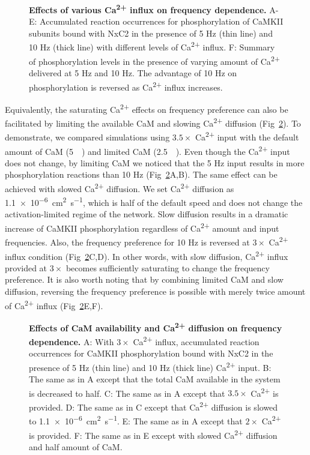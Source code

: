 \documentclass[10pt,letterpaper]{article}
\begin{document}
\begin{figure}[!h]
	\caption{{\bf Effects of various Ca\textsuperscript{2+} influx on frequency dependence.}
	A-E: Accumulated reaction occurrences for phosphorylation of CaMKII subunits bound with NxC2 in the presence of 5 Hz (thin line) and 10 Hz (thick line) with different levels of Ca\textsuperscript{2+} influx. 
	F: Summary of phosphorylation levels in the presence of varying amount of Ca\textsuperscript{2+} delivered at 5 Hz and 10 Hz. The advantage of 10 Hz on phosphorylation is reversed as Ca\textsuperscript{2+} influx increases.
	}
\label{fig9}
\end{figure}

Equivalently, the saturating Ca\textsuperscript{2+} effects on frequency preference can also be facilitated by limiting the available CaM and slowing Ca\textsuperscript{2+} diffusion (Fig~\ref{fig10}). To demonstrate, we compared simulations using $3.5\times$ Ca\textsuperscript{2+} input with the default amount of CaM (\SI{5}{\micro\Molar}) and limited CaM (\SI{2.5}{\micro\Molar}). Even though the Ca\textsuperscript{2+} input does not change, by limiting CaM we noticed that the 5 Hz input results in more phosphorylation reactions than 10 Hz (Fig~\ref{fig10}A,B). The same effect can be achieved with slowed Ca\textsuperscript{2+} diffusion. We set Ca\textsuperscript{2+} diffusion as \SI{1.1e-6}{\square\cm\per\s}, which is half of the default speed and does not change the activation-limited regime of the network. Slow diffusion results in a dramatic increase of CaMKII phosphorylation regardless of Ca\textsuperscript{2+} amount and input frequencies. Also, the frequency preference for 10 Hz is reversed at $3\times$ Ca\textsuperscript{2+} influx condition (Fig~\ref{fig10}C,D). In other words, with slow diffusion, Ca\textsuperscript{2+} influx provided at $3\times$ becomes sufficiently saturating to change the frequency preference. It is also worth noting that by combining limited CaM and slow diffusion, reversing the frequency preference is possible with merely twice amount of Ca\textsuperscript{2+} influx (Fig~\ref{fig10}E,F). 

\begin{figure}[!h]
	\caption{{\bf Effects of CaM availability and Ca\textsuperscript{2+} diffusion on frequency dependence.}
	A: With $3\times$ Ca\textsuperscript{2+} influx, accumulated reaction occurrences for CaMKII phosphorylation bound with NxC2 in the presence of 5 Hz (thin line) and 10 Hz (thick line) Ca\textsuperscript{2+} input.
	B: The same as in A except that the total CaM available in the system is decreased to half. 
	C: The same as in A except that $3.5\times$ Ca\textsuperscript{2+} is provided.
	D: The same as in C except that Ca\textsuperscript{2+} diffusion is slowed  to \SI{1.1e-6}{\square\cm\per\s}. 
	E: The same as in A except that $2\times$ Ca\textsuperscript{2+} is provided.
	F: The same as in E except with slowed Ca\textsuperscript{2+} diffusion and half amount of CaM.
	}
\label{fig10}
\end{figure}
\end{document}
